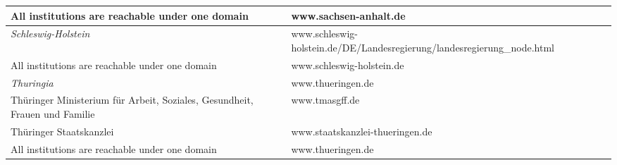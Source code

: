 \begin{spacing}{.5}
\begin{longtable}{ p{} p{}}
All institutions are reachable under one domain & www.sachsen-anhalt.de \\
\hline
\textit{Schleswig-Holstein} & www.schleswig-holstein.de/DE/\newline Landesregierung/\newline landesregierung\_node.html \\
All institutions are reachable under one domain & www.schleswig-holstein.de \\
\hline
\textit{Thuringia} & www.thueringen.de \\
Thüringer Ministerium für Arbeit, Soziales, Gesundheit, Frauen und Familie	& www.tmasgff.de \\
Thüringer Staatskanzlei	& www.staatskanzlei-thueringen.de \\
All institutions are reachable under one domain & www.thueringen.de \\
\hline
\hline
\hline
\hline
\end{longtable}
\endgroup
\end{spacing}
%
\newpage
%
\begingroup
